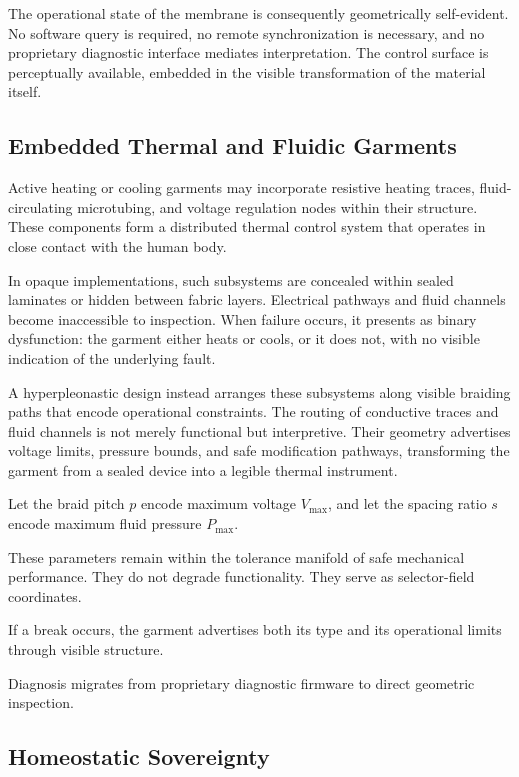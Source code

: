 \documentclass[11pt]{article}
\begin{document}
The operational state of the membrane is consequently geometrically
self-evident. No software query is required, no remote synchronization
is necessary, and no proprietary diagnostic interface mediates
interpretation. The control surface is perceptually available, embedded
in the visible transformation of the material itself.

\subsection{Embedded Thermal and Fluidic Garments}

Active heating or cooling garments may incorporate resistive heating
traces, fluid-circulating microtubing, and voltage regulation nodes
within their structure. These components form a distributed thermal
control system that operates in close contact with the human body.

In opaque implementations, such subsystems are concealed within sealed
laminates or hidden between fabric layers. Electrical pathways and
fluid channels become inaccessible to inspection. When failure occurs,
it presents as binary dysfunction: the garment either heats or cools,
or it does not, with no visible indication of the underlying fault.

A hyperpleonastic design instead arranges these subsystems along
visible braiding paths that encode operational constraints. The routing
of conductive traces and fluid channels is not merely functional but
interpretive. Their geometry advertises voltage limits, pressure bounds,
and safe modification pathways, transforming the garment from a sealed
device into a legible thermal instrument.

Let the braid pitch $p$ encode maximum voltage $V_{\max}$, and 
let the spacing ratio $s$ encode maximum fluid pressure $P_{\max}$.

These parameters remain within the tolerance manifold of safe 
mechanical performance. They do not degrade functionality. 
They serve as selector-field coordinates.

If a break occurs, the garment advertises both its type and its 
operational limits through visible structure.

Diagnosis migrates from proprietary diagnostic firmware to 
direct geometric inspection.

\subsection{Homeostatic Sovereignty}
\end{document}
